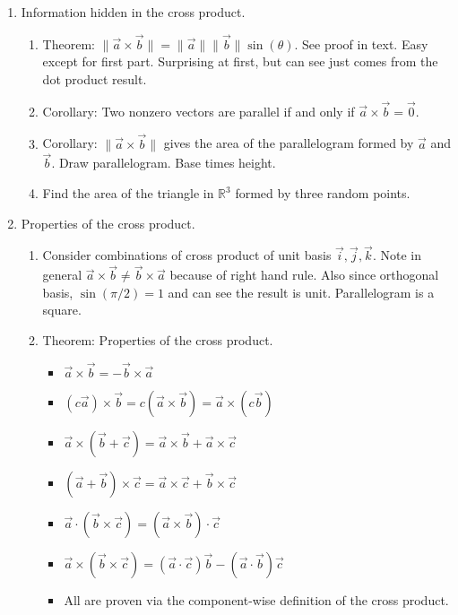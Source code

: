 \documentclass{article}
\begin{document}
\begin{enumerate}
\item Information hidden in the cross product.
\begin{enumerate}
\item Theorem: $\| \vec{a} \times \vec{b} \| = \|\vec{a} \| \|\vec{b} \| \sin(\theta)$. See proof in text. Easy except for first part. Surprising at first, but can see just comes from the dot product result.
\item Corollary: Two nonzero vectors are parallel if and only if $\vec{a} \times \vec{b} = \vec{0}$.
\item Corollary:  $\| \vec{a} \times \vec{b} \|$ gives the area of the parallelogram formed by $\vec{a}$ and $\vec{b}$. Draw parallelogram. Base times height.
\item Find the area of the triangle in $\mathbb{R}^3$ formed by three random points.
\end{enumerate}

\item Properties of the cross product.
\begin{enumerate}
\item Consider combinations of cross product of unit basis $\vec{i}, \vec{j}, \vec{k}$. Note in general $\vec{a} \times \vec{b} \neq \vec{b} \times \vec{a}$ because of right hand rule. Also since orthogonal basis, $\sin(\pi/2)=1$ and can see the result is unit. Parallelogram is a square.
\item Theorem: Properties of the cross product.
\begin{itemize}
\item $\vec{a} \times \vec{b} = - \vec{b} \times \vec{a}$
\item $(c\vec{a}) \times \vec{b} = c(\vec{a} \times \vec{b}) = \vec{a} \times (c\vec{b})$
\item $\vec{a} \times (\vec{b}+\vec{c}) = \vec{a} \times \vec{b}+ \vec{a} \times\vec{c}$
\item $(\vec{a} + \vec{b}) \times \vec{c} = \vec{a} \times \vec{c}+ \vec{b} \times\vec{c}$
\item $\vec{a} \cdot (\vec{b} \times \vec{c}) = (\vec{a} \times \vec{b} ) \cdot \vec{c}$
\item $\vec{a} \times (\vec{b} \times \vec{c}) = (\vec{a} \cdot \vec{c})\vec{b} - (\vec{a} \cdot \vec{b}) \vec{c}$
\item All are proven via the component-wise definition of the cross product.
\end{itemize}
\end{enumerate}


\end{enumerate}
\end{document}
